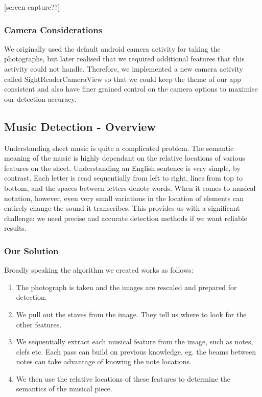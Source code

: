 [screen capture??]

\subsubsection{Camera Considerations}
We originally used the default android camera activity for taking the photographs, but later realised that we required additional features that this activity could not handle. Therefore, we implemented a new camera activity called SightReaderCameraView so that we could keep the theme of our app consistent and also have finer grained control on the camera options to maximise our detection accuracy.

\subsection{Music Detection - Overview}
Understanding sheet music is quite a complicated problem. The semantic meaning of the music is highly dependant on the relative locations of various features on the sheet. Understanding an English sentence is very simple, by contrast. Each letter is read sequentially from left to right, lines from top to bottom, and the spaces between letters denote words. When it comes to musical notation, however, even very small variations in the location of elements can entirely change the sound it
transcribes. This provides us with a significant challenge: we need precise and accurate detection methods if we want reliable results.

\subsubsection{Our Solution}

Broadly speaking the algorithm we created works as follows: 

\begin{enumerate}
\item{The photograph is taken and the images are rescaled and prepared for detection.}
\item{We pull out the staves from the image. They tell us where to look for the other features.}
\item{We sequentially extract each musical feature from the image, such as notes, clefs etc. Each pass can build on previous knowledge, eg. the beams between notes can take advantage of knowing the note locations.}
\item{We then use the relative locations of these features to determine the semantics of the musical piece.}
\end{enumerate}

